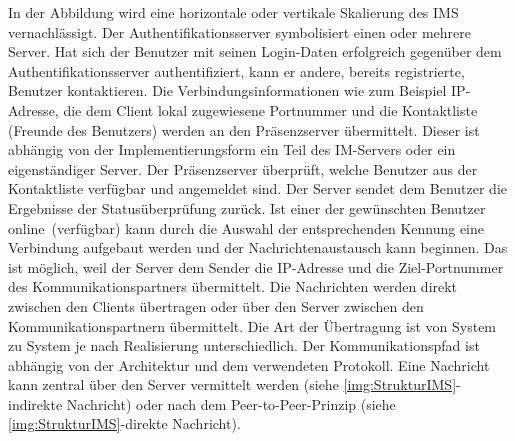 \documentclass[a4paper,titlepage,halfparskip,12pt]{scrreprt}
\begin{document}
\begin{onehalfspacing}
In der Abbildung wird eine horizontale oder vertikale Skalierung des \ac{IMS} vernachlässigt. Der Authentifikationsserver symbolisiert einen oder mehrere Server. Hat sich der Benutzer mit seinen Login-Daten erfolgreich gegenüber dem Authentifikationsserver authentifiziert, kann er andere, bereits registrierte, Benutzer kontaktieren. Die Verbindungsinformationen wie zum Beispiel IP-Adresse, die dem Client lokal zugewiesene Portnummer und die Kontaktliste (Freunde des Benutzers) werden an den Präsenzserver übermittelt. Dieser ist abhängig von der Implementierungsform ein Teil des IM-Servers oder ein eigenständiger Server. Der Präsenzserver überprüft, welche Benutzer aus der Kontaktliste verfügbar und angemeldet sind. Der Server sendet dem Benutzer die Ergebnisse der Statusüberprüfung zurück. Ist einer der gewünschten Benutzer \glqq online\grqq\ (verfügbar) kann durch die Auswahl der entsprechenden Kennung eine Verbindung aufgebaut werden und der Nachrichtenaustausch kann beginnen. Das ist möglich, weil der Server dem Sender die IP-Adresse und die Ziel-Portnummer des Kommunikationspartners übermittelt. Die Nachrichten werden direkt zwischen den Clients übertragen oder über den Server zwischen den Kommunikationspartnern übermittelt. Die Art der Übertragung ist von System zu System je nach Realisierung unterschiedlich. Der Kommunikationspfad ist abhängig von der Architektur und dem verwendeten Protokoll. Eine Nachricht kann zentral über den Server vermittelt werden (siehe \autoref{img:StrukturIMS}-indirekte Nachricht) oder nach dem Peer-to-Peer-Prinzip (siehe \autoref{img:StrukturIMS}-direkte Nachricht).


\end{onehalfspacing}
\end{document}
